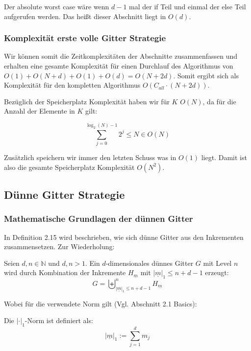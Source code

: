 \documentclass[a4paper,12pt]{llncs}
\numberwithin{equation}{section}
\begin{document}
Der absolute worst case wäre wenn $d-1$ mal der if Teil und einmal der else Teil aufgerufen werden. Das heißt dieser Abschnitt liegt in $O(d)$.

\subsubsection{Komplexität erste volle Gitter Strategie}

Wir können somit die Zeitkomplexitäten der Abschnitte zusammenfassen und erhalten eine gesamte Komplexität für einen Durchlauf des Algorithmus von $O(1)+O(N+d)+O(1)+O(d)=O(N+2d)$. Somit ergibt sich als Komplexität für den kompletten Algorithmus $O(C_{all}\cdot (N+2d))$.


Bezüglich der Speicherplatz Komplexität haben wir für $K$ $O(N)$, da für die Anzahl der Elemente in $K$ gilt:

\begin{equation}
\sum_{j=0}^{\log_2(N)-1}2^j\leq N \in O\left(N\right)
\end{equation}


Zusätzlich speichern wir immer den letzten Schuss was in $O(1)$ liegt. Damit ist also die gesamte Speicherplatz Komplexität $O(N^2)$.


\subsection{Dünne Gitter Strategie}

\subsubsection{Mathematische Grundlagen der dünnen Gitter}

In \cite{M13} Definition 2.15 wird beschrieben, wie sich dünne Gitter aus den Inkrementen zusammensetzen. Zur Wiederholung:

\begin{definition}
	Seien $d,n\in\mathbb{N}$ und $d,n>1$. Ein $d$-dimensionales dünnes Gitter $G$ mit Level $n$ wird durch Kombination der Inkremente $H_{\underline{m}}$ mit $|\underline{m}|_1\leq n+d-1$ erzeugt:
	\begin{equation}
	G=\biguplus_{|\underline{m}|_1\leq n+d-1}^n H_{\underline{m}}
	\end{equation}
\end{definition}

Wobei für die verwendete Norm gilt (Vgl. \cite{P10} Abschnitt 2.1 Basics):

\begin{definition}
Die  $|\cdot|_1$-Norm ist definiert als:
	\begin{equation}
	|\underline{m}|_1:=\sum_{j=1}^d m_j
	\end{equation}
\end{definition}
\end{document}

